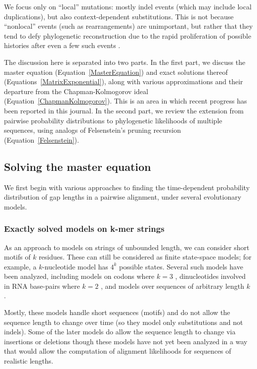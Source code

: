 \documentclass{bmcart}
\newcommand{\eqref}[1]{Equation~\ref{#1}}
\begin{document}
We focus only on ``local'' mutations: mostly indel events (which may include local duplications),
but also context-dependent substitutions.
This is not because ``nonlocal'' events (such as rearrangements) are unimportant,
but rather that they tend to defy phylogenetic reconstruction due to the rapid proliferation of possible histories
after even a few such events \cite{pmid9773350}.

The discussion here is separated into two parts.
In the first part, we discuss
the master equation (\eqref{MasterEquation})
and exact solutions thereof (Equations~\ref{MatrixExponential}),
along with various approximations and their departure from the Chapman-Kolmogorov ideal (\eqref{ChapmanKolmogorov}).
This is an area in which recent progress has been reported in this journal.
In the second part, we review
the extension from pairwise probability distributions
to phylogenetic likelihoods of multiple sequences,
using analogs of Felsenstein's pruning recursion (\eqref{Felsenstein}).

\subsection*{Solving the master equation}

We first begin with various approaches to finding the time-dependent probability distribution
of gap lengths in a pairwise alignment,
under several evolutionary models.

\color{red}
\subsubsection*{Exactly solved models on k-mer strings}

As an approach to models on strings of unbounded length, we can consider short motifs of $k$ residues.
These can still be considered as finite state-space models;
for example, a $k$-nucleotide model has $4^k$ possible states.
Several such models have been analyzed, including models on codons where $k=3$
\cite{pmid8281128,pmid7968486},
dinucleotides involved in RNA base-pairs where $k=2$ \cite{pmid7475089,KnudsenHein99,pmid17884102},
and models over sequences of arbitrary length $k$ \cite{LunterHein04,pmid26135206}.

Mostly, these models handle short sequences (motifs) and do not allow the sequence length to change over time
(so they model only substitutions and not indels).
Some of the later models do allow the sequence length to change via insertions or deletions
\cite{pmid26135206} though these models have not yet been analyzed in a way that would allow the
computation of alignment likelihoods for sequences of realistic lengths.
\color{black}
\end{document}
